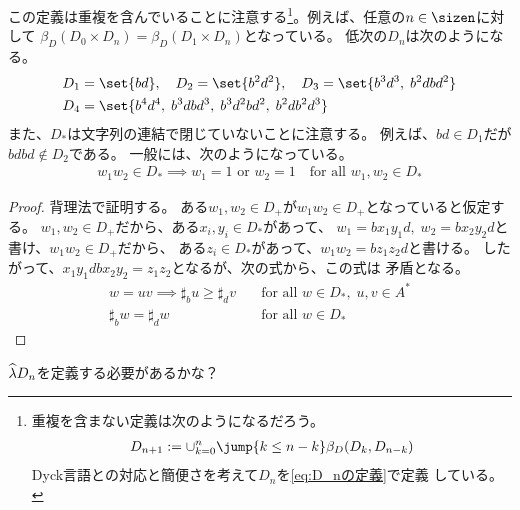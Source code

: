 {	この定義は重複を含んでいることに注意する\footnote{
		重複を含まない定義は次のようになるだろう。
		\begin{equation*}\begin{split}
			D_{n+1} := \cup_{k=0}^n \jump{k\le n-k} \beta_D(D_k, D_{n-k})
		\end{split}\end{equation*}
		Dyck言語との対応と簡便さを考えて$D_n$を\eqref{eq:D_nの定義}で定義
		している。
	}。例えば、任意の$n\in\sizen$に対して
	$\beta_D(D_0\times D_n)=\beta_D(D_1\times D_n)$となっている。
	低次の$D_n$は次のようになる。
	\begin{equation*}\begin{split}
		D_1 &= \set{bd},\quad D_2 = \set{b^2d^2}
		,\quad D_3 = \set{b^3d^3,\; b^2dbd^2} \\
		D_4 &= \set{b^4d^4,\; b^3dbd^3,\; b^3d^2bd^2,\; b^2db^2d^3} \\
	\end{split}\end{equation*}
	また、$D_*$は文字列の連結で閉じていないことに注意する。
	例えば、$bd\in D_1$だが$bdbd\not\in D_2$である。
	一般には、次のようになっている。
	\begin{equation*}\begin{split}
		w_1w_2\in D_* \implies w_1 = 1 \text{ or } w_2 = 1
		\quad\text{for all } w_1,w_2\in D_*
	\end{split}\end{equation*}
	\begin{proof} %
		背理法で証明する。
		ある$w_1,w_2\in D_+$が$w_1w_2\in D_+$となっていると仮定する。
		$w_1,w_2\in D_+$だから、ある$x_i,y_i\in D_*$があって、
		$w_1=bx_1y_1d,\;w_2=bx_2y_2d$と書け、$w_1w_2\in D_+$だから、
		ある$z_i\in D_*$があって、$w_1w_2=bz_1z_2d$と書ける。
		したがって、$x_1y_1dbx_2y_2=z_1z_2$となるが、次の式から、この式は
		矛盾となる。
		\begin{equation*}\begin{split}
			w = uv \implies \sharp_bu\ge\sharp_dv
			&\quad\text{for all } w\in D_*,\; u,v\in A^* \\
			\sharp_bw = \sharp_d w &\quad\text{for all } w\in D_*
		\end{split}\end{equation*}
	\end{proof} %

	\begin{todo}[必要性]\label{todo:必要性} %
		$\widehat{\lambda} D_n$を定義する必要があるかな？
	\end{todo} %

}
